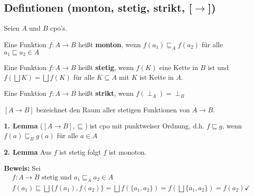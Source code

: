 \begin{compactitem}
\subsection{Defintionen (monton, stetig, strikt, [$\rightarrow$])}
Seien $A$ und $B$ cpo's. 
\begin{compactitem}
	\item Eine Funktion $f: A \rightarrow B$ heißt \textbf{monton}, wenn $f(a_1) \sqsubseteq_A f(a_2)$ für alle $a_1 \sqsubseteq a_2 \in A$
	\item Eine Funktion $f: A \rightarrow B$ heißt \textbf{stetig}, wenn $f(K)$ eine Kette in $B$ ist und $f(\bigsqcup K) = \bigsqcup f(K)$ für alle $K \subseteq A$ mit $K$ ist Kette in $A$.
	\item Eine Funktion $f: A \rightarrow B$ heißt \textbf{strikt}, wenn $f(\perp_A) = \perp_B$
	\item $[A\rightarrow B]$ bezeichnet den Raum aller stetigen Funktionen von $A \rightarrow B$.
	\item[\textbf{1. Lemma}] ($[A\rightarrow B], \sqsubseteq$) ist cpo mit punktweiser Ordnung, d.h. $f \sqsubseteq g$, wenn $f (a) \sqsubseteq_B g(a)$ für alle $a \in A$
	\item[\textbf{2. Lemma}] Aus $f$ ist stetig folgt $f$ ist monoton.
	\item[\textbf{Beweis:}] Sei
	\begin{align*}
	&f: A \rightarrow B \text{ stetig und } a_1 \sqsubseteq_A a_2 \in A\\
	&f(a_1) \sqsubseteq \bigsqcup\{f(a_1), f(a_2) \} = \bigsqcup f(\{a_1, a_2\}) = f (\bigsqcup\{a_1, a_2\}) = f(a_2) \checkmark\\
	\end{align*}
\end{compactitem}

\end{compactitem}
